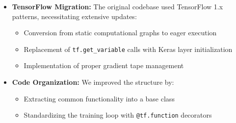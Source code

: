 \documentclass[10pt,journal,compsoc]{IEEEtran}
\begin{document}
\begin{itemize}
    \item \textbf{TensorFlow Migration:} The original codebase used TensorFlow 1.x patterns, necessitating extensive updates:
    \begin{itemize}
        \item Conversion from static computational graphs to eager execution
        \item Replacement of \texttt{tf.get\_variable} calls with Keras layer initialization
        \item Implementation of proper gradient tape management
    \end{itemize}
    
    \item \textbf{Code Organization:} We improved the structure by:
    \begin{itemize}
        \item Extracting common functionality into a base class
        \item Standardizing the training loop with \texttt{@tf.function} decorators
    \end{itemize}
\end{itemize}
\end{document}
